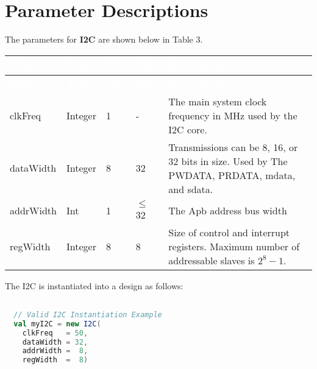 \section{Parameter Descriptions}

The parameters for \textbf{I2C} are shown below in
Table 3.

\renewcommand*{\arraystretch}{1.4}
\begingroup
\small
{}

\begin{longtable}[H]{
  | p{}
  | p{}
  | p{}
  | p{}
  | p{} |
}
\hline
\rowcolor{gray}

\textcolor{white}{\textbf{Name}} &
\textcolor{white}{\textbf{Type}} &
\textcolor{white}{\textbf{Min}} &
\textcolor{white}{\textbf{Max}} &
\textcolor{white}{\textbf{Description}} \\ \hline
\endfirsthead

\textcolor{white}{\textbf{Name}} &
\textcolor{white}{\textbf{Type}} &
\textcolor{white}{\textbf{Min}} &
\textcolor{white}{\textbf{Max}} &
\textcolor{white}{\textbf{Description}}            \\ \hline
\endhead


\endfoot

clkFreq &
Integer &
1 &
- &
The main system clock frequency in MHz used by the I2C core. \\ \hline

dataWidth &
Integer &
8 &
32 &
Transmissions can be 8, 16, or 32 bits in size. Used by The PWDATA, PRDATA, mdata, and sdata. \\ \hline

addrWidth     &
Int           &
1             &
$\leq$ 32       &
The Apb address bus width  \\ \hline

regWidth &
Integer &
8 &
8 &
Size of control and interrupt registers. Maximum number of addressable slaves is $2^8 - 1$.

\end{longtable}
\captionsetup{aboveskip=0pt}
\label{table:params}
\endgroup

The I2C is instantiated into a design as follows:

\begin{lstlisting}[language=Scala]

  // Valid I2C Instantiation Example
  val myI2C = new I2C(
    clkFreq   = 50,
    dataWidth = 32, 
    addrWidth =  8, 
    regWidth  =  8) 

  \end{lstlisting}

